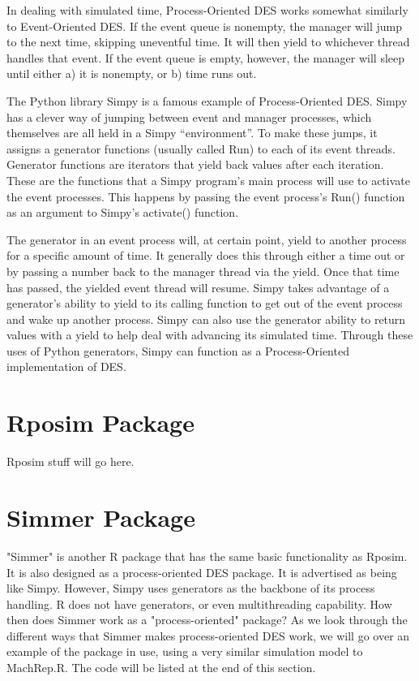 \documentclass[a4paper, 11pt]{article} %
\begin{document}
In dealing with simulated time, Process-Oriented DES works somewhat similarly to Event-Oriented DES. If the event queue is nonempty, the manager will jump to the next time, skipping uneventful time. It will then yield to whichever thread handles that event. If the event queue is empty, however, the manager will sleep until either a) it is nonempty, or b) time runs out. 


The Python library Simpy is a famous example of Process-Oriented DES. Simpy has a clever way of jumping between event and manager processes, which themselves are all held in a Simpy “environment”. To make these jumps, it assigns a generator functions (usually called Run) to each of its event threads. Generator functions are iterators that yield back values after each iteration. These are the functions that a Simpy program’s main process will use to activate the event processes. This happens by passing the event process’s Run() function as an argument to Simpy’s activate() function.


The generator in an event process will, at certain point, yield to another process for a specific amount of time. It generally does this through either a time out or by passing a number back to the manager thread via the yield. Once that time has passed, the yielded event thread will resume. Simpy takes advantage of a generator’s ability to yield to its calling function to get out of the event process and wake up another process. Simpy can also use the generator ability to return values with a yield to help deal with advancing its simulated time. Through these uses of Python generators, Simpy can function as a Process-Oriented implementation of DES.




\section*{Rposim Package}


Rposim stuff will go here. \pagebreak




\section*{Simmer Package}


"Simmer" is another R package that has the same basic functionality as Rposim. It is also designed as a process-oriented DES package. It is advertised as being like Simpy. However, Simpy uses generators as the backbone of its process handling. R does not have generators, or even multithreading capability. How then does Simmer work as a "process-oriented" package? As we look through the different ways that Simmer makes process-oriented DES work, we will go over an example of the package in use, using a very similar simulation model to MachRep.R. The code will be listed at the end of this section.
\end{document}
